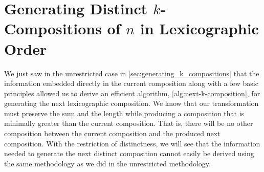 \section{Generating Distinct $k$-Compositions of $n$ in Lexicographic Order}
\label{sec:distinct-case}

We just saw in the unrestricted case in \cref{sec:generating_k_compositions} that the information embedded directly in the current composition along with a few basic principles allowed us to derive an efficient algorithm, \cref{alg:next-k-composition}, for generating the next lexicographic composition. We know that our transformation must preserve the sum and the length while producing a composition that is minimally greater than the current composition. That is, there will be no other composition between the current composition and the produced next composition. With the restriction of distinctness, we will see that the information needed to generate the next distinct composition cannot easily be derived using the same methodology as we did in the unrestricted methodology.

